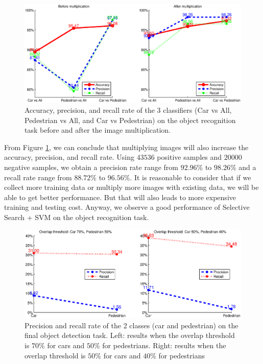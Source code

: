 \documentclass{article} %
\begin{document}
\begin{figure}[htb]
\begin{center}
\includegraphics[width=.9\textwidth]{test_apr.eps}
\end{center}
\caption{Accuracy, precision, and recall rate of the 3 classifiers (Car vs All, Pedestrian vs All, and Car vs Pedestrian) on the object recognition task before and after the image multiplication.
\label{fig:test-apr}}
\end{figure}


From Figure \ref{fig:test-apr}, we can conclude that multiplying images will also increase the accuracy, precision, and recall rate. Using $43536$ positive samples and $20000$ negative samples, we obtain a precision rate range from $92.96\%$ to $98.26\%$ and a recall rate range from $88.72\%$ to $96.56\%$. It is reasonable to consider that if we collect more training data or multiply more images with existing data, we will be able to get better performance. But that will also leads to more expensive training and testing cost. Anyway, we observe a good performance of Selective Search + SVM on the object recognition task.

\begin{figure}[htb]
\begin{center}
\includegraphics[width=\textwidth]{test-result.eps}
\end{center}
\caption{Precision and recall rate of the 2 classes (car and pedestrian) on the final object detection task. Left: results when the overlap threshold is $70\%$ for cars and $50\%$ for pedestrians. Right: results when the overlap threshold is $50\%$ for cars and $40\%$ for pedestrians
\label{fig:test-result}}
\end{figure}
\end{document}
